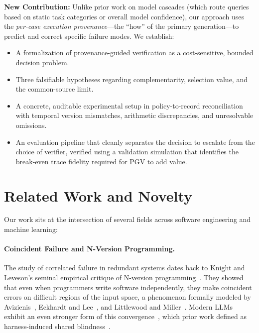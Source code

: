 \documentclass[manuscript,screen,nonacm]{acmart}
\begin{document}
\textbf{New Contribution:} Unlike prior work on model cascades (which route queries based on static task categories or overall model confidence), our approach uses the \emph{per-case execution provenance}—the ``how'' of the primary generation—to predict and correct specific failure modes. We establish:
\begin{itemize}
    \item A formalization of provenance-guided verification as a cost-sensitive, bounded decision problem.
    \item Three falsifiable hypotheses regarding complementarity, selection value, and the common-source limit.
    \item A concrete, auditable experimental setup in policy-to-record reconciliation with temporal version mismatches, arithmetic discrepancies, and unresolvable omissions.
    \item An evaluation pipeline that cleanly separates the decision to escalate from the choice of verifier, verified using a validation simulation that identifies the break-even trace fidelity required for PGV to add value.
\end{itemize}

\section{Related Work and Novelty}
\label{sec:related}

Our work sits at the intersection of several fields across software engineering and machine learning:

\paragraph{Coincident Failure and N-Version Programming.}
The study of correlated failure in redundant systems dates back to Knight and Leveson's seminal empirical critique of N-version programming~\cite{knight1986experimental}. They showed that even when programmers write software independently, they make coincident errors on difficult regions of the input space, a phenomenon formally modeled by Avizienis~\cite{avizienis1985nversion}, Eckhardt and Lee~\cite{eckhardt1985theoretical}, and Littlewood and Miller~\cite{littlewood1989conceptual}. Modern LLMs exhibit an even stronger form of this convergence~\cite{kim2025correlated,goel2025great}, which prior work defined as harness-induced shared blindness~\cite{paul2026shared}.
\end{document}
